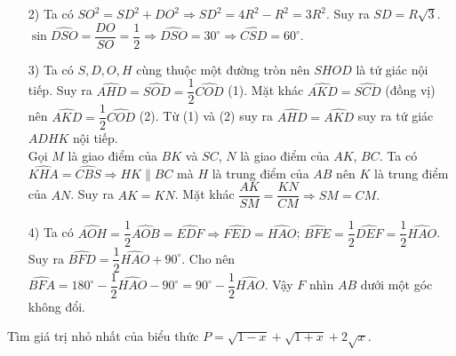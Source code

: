\begin{ex}
{\begin{enumerate}
\item[2)] Ta có $SO^2=SD^2+DO^2 \Rightarrow SD^2=4R^2-R^2 =3R^2$. Suy ra $SD = R\sqrt{3}$. \\
$\sin \widehat{DSO} = \dfrac{DO}{SO} = \dfrac{1}{2} \Rightarrow \widehat{DSO} = 30^\circ \Rightarrow \widehat{CSD} = 60^\circ.$
\item[3)] Ta có $S,D,O,H$ cùng thuộc một đường tròn nên $SHOD$ là tứ giác nội tiếp. Suy ra $\widehat{AHD} = \widehat{SOD} = \dfrac{1}{2} \widehat{COD}$ (1). Mặt khác $\widehat{AKD} = \widehat{SCD}$ (đồng vị) nên $\widehat{AKD} = \dfrac{1}{2} \widehat{COD}$ (2). Từ (1) và (2) suy ra $\widehat{AHD}= \widehat{AKD}$ suy ra tứ giác $ADHK$ nội tiếp. \\
Gọi $M$ là giao điểm của $BK$ và $SC$, $N$ là giao điểm của $AK$, $BC$. Ta có $\widehat{KHA} =\widehat{CBS} \Rightarrow HK \parallel BC$ mà $H$ là trung điểm của $AB$ nên $K$ là trung điểm của $AN$. Suy ra $AK=KN$. Mặt khác $\dfrac{AK}{SM} = \dfrac{KN}{CM} \Rightarrow SM=CM.$
\item[4)] Ta có $\widehat{AOH} = \dfrac{1}{2} \widehat{AOB}  =\widehat{EDF} \Rightarrow \widehat{FED} =\widehat{HAO}$;  $\widehat{BFE} = \dfrac{1}{2}\widehat{DEF} = \dfrac{1}{2}\widehat{HAO}$. Suy ra $\widehat{BFD} = \dfrac{1}{2} \widehat{HAO} +90^\circ$. Cho nên  $\widehat{BFA} = 180^\circ -\dfrac{1}{2} \widehat{HAO} -90^\circ =90^\circ -\dfrac{1}{2} \widehat{HAO}$. Vậy $F$ nhìn $AB$ dưới một góc không đổi.
\end{enumerate}
}
\end{ex}

\begin{ex}%
Tìm giá trị nhỏ nhất của biểu thức $P= \sqrt{1-x} +\sqrt{1+x} +2\sqrt{x}$. 
\end{ex}

